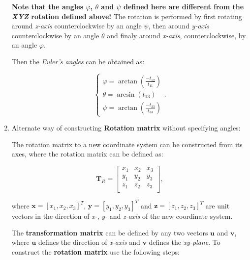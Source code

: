 \begin{enumerate}
        \textbf{Note that the angles $\varphi$, $\theta$ and $\psi$ defined here are
        different from the \textit{XYZ} rotation defined above!} The rotation
        is performed by first rotating around \textit{z-axis} counterclockwise
        by an angle $\psi$, then around \textit{y-axis} counterclockwise
        by an angle $\theta$ and finaly around \textit{x-axis}, counterclockwise,
        by an angle $\varphi$.

        Then the \textit{Euler's angles} can be obtained as:

        \begin{equation}
            \left\{ \begin{array}{l}
                \varphi = \arctan \left( \frac{-t_{12}}{t_{11}} \right)\\
                \theta = \arcsin \left( t_{13} \right) \\
                \psi = \arctan \left( \frac{-t_{23}}{t_{33}} \right)
            \end{array} \right.
        .\end{equation}


    \item Alternate way of constructing \textbf{Rotation matrix} without specifying
        angles:

        The rotation matrix to a new coordinate system can be constructed from
        its axes, where the rotation matrix can be defined as:

        \begin{equation}
            \mathbf{T}_{R} = \begin{bmatrix}
                x_1 & x_2 & x_3 \\
                y_1 & y_2 & y_3 \\
                z_1 & z_2 & z_3 \\
            \end{bmatrix}
        ,\end{equation}

        where $\mathbf{x} = [x_1, x_2, x_3]^{T}$, $\mathbf{y} = [y_1, y_2, y_3]^{T}$
        and  $\mathbf{z} = [z_1, z_2, z_3]^{T}$ are unit vectors in the direction
        of \textit{x-}, \textit{y-} and \textit{z-axis} of the new coordinate
        system.


        \begin{bbox}[0.85]
            The \textbf{transformation matrix} can be defined by any two vectors
            $\mathbf{u}$ and $\mathbf{v}$, where $\mathbf{u}$ defines the direction
            of \textit{x-axis} and $\mathbf{v}$ defines the \textit{xy-plane}.
            To construct the \textbf{rotation matrix} use the following steps:


\end{bbox}
\end{enumerate}
